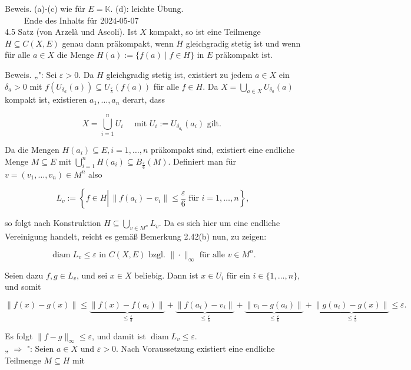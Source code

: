 \documentclass[10pt, letterpaper]{article}
\begin{document}
Beweis. (a)-(c) wie für $E=\mathbb{K}$. (d): leichte Übung.\\
$\qquad$ Ende des Inhalts für 2024-05-07\\
4.5 Satz (von Arzelà und Ascoli). Ist $X$ kompakt, so ist eine Teilmenge $H \subseteq C(X, E)$ genau dann präkompakt, wenn $H$ gleichgradig stetig ist und wenn für alle $a \in X$ die Menge $H(a):=\{f(a) \mid f \in H\}$ in $E$ präkompakt ist.

Beweis. „": Sei $\varepsilon>0$. Da $H$ gleichgradig stetig ist, existiert zu jedem $a \in X$ ein $\delta_{a}>0$ mit $f\left(U_{\delta_{a}}(a)\right) \subseteq U_{\frac{\varepsilon}{3}}(f(a))$ für alle $f \in H$. Da $X=\bigcup_{a \in X} U_{\delta_{a}}(a)$ kompakt ist, existieren $a_{1}, \ldots, a_{n}$ derart, dass

$$
X=\bigcup_{i=1}^{n} U_{i} \quad \text { mit } U_{i}:=U_{\delta_{a_{i}}}\left(a_{i}\right) \text { gilt. }
$$

Da die Mengen $H\left(a_{i}\right) \subseteq E, i=1, \ldots, n$ präkompakt sind, existiert eine endliche Menge $M \subseteq E$ mit $\bigcup_{i=1}^{n} H\left(a_{i}\right) \subseteq B_{\frac{\varepsilon}{6}}(M)$. Definiert man für $v=\left(v_{1}, \ldots, v_{n}\right) \in M^{n}$ also

$$
L_{v}:=\left\{f \in H \left\lvert\,\left\|f\left(a_{i}\right)-v_{i}\right\| \leq \frac{\varepsilon}{6}\right. \text { für } i=1, \ldots, n\right\},
$$

so folgt nach Konstruktion $H \subseteq \bigcup_{v \in M^{n}} L_{v}$. Da es sich hier um eine endliche Vereinigung handelt, reicht es gemäß Bemerkung 2.42(b) nun, zu zeigen:

$$
\operatorname{diam} L_{v} \leq \varepsilon \text { in } C(X, E) \text { bzgl. }\|\cdot\|_{\infty} \text { für alle } v \in M^{n} .
$$

Seien dazu $f, g \in L_{v}$, und sei $x \in X$ beliebig. Dann ist $x \in U_{i}$ für ein $i \in\{1, \ldots, n\}$, und somit

$$
\|f(x)-g(x)\| \leq \underbrace{\left\|f(x)-f\left(a_{i}\right)\right\|}_{\leq \frac{\varepsilon}{3}}+\underbrace{\left\|f\left(a_{i}\right)-v_{i}\right\|}_{\leq \frac{\varepsilon}{6}}+\underbrace{\left\|v_{i}-g\left(a_{i}\right)\right\|}_{\leq \frac{\varepsilon}{6}}+\underbrace{\left\|g\left(a_{i}\right)-g(x)\right\|}_{\leq \frac{\varepsilon}{3}} \leq \varepsilon .
$$

Es folgt $\|f-g\|_{\infty} \leq \varepsilon$, und damit ist $\operatorname{diam} L_{v} \leq \varepsilon$.\\
„ $\Longrightarrow$ ": Seien $a \in X$ und $\varepsilon>0$. Nach Voraussetzung existiert eine endliche Teilmenge $M \subseteq H$ mit
\end{document}
